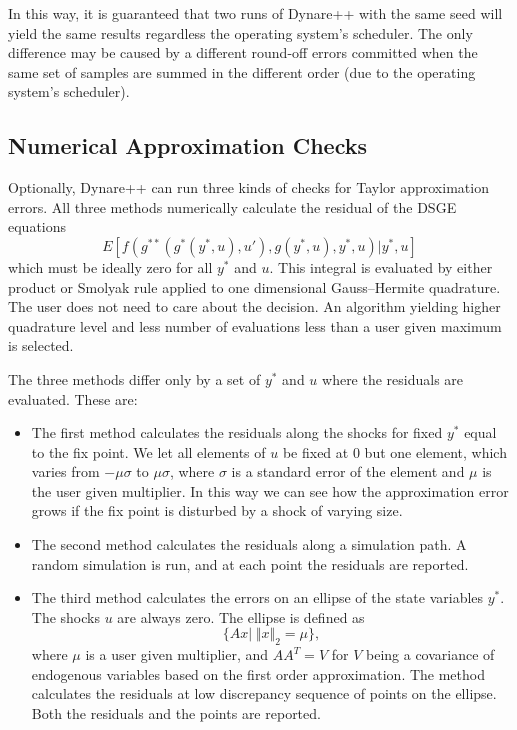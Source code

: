 \documentclass[10pt]{article}
\begin{document}
In this way, it is guaranteed that two runs of Dynare++
with the same seed will yield the same results regardless the
operating system's scheduler. The only difference may be caused by a
different round-off errors committed when the same set of samples are
summed in the different order (due to the operating system's scheduler).

\subsection{Numerical Approximation Checks}
\label{checks}

Optionally, Dynare++ can run three kinds of checks for Taylor
approximation errors. All three methods numerically calculate
the residual of the DSGE equations
\[
E[f(g^{**}(g^*(y^*,u),u'),g(y^*,u),y^*,u)|y^*,u]
\]
which must be ideally zero for all $y^*$ and $u$. This integral is
evaluated by either product or Smolyak rule applied to one dimensional
Gauss--Hermite quadrature. The user does not need to care about the
decision. An algorithm yielding higher quadrature level and less
number of evaluations less than a user given maximum is selected.

The three methods differ only by a set of $y^*$ and $u$ where the
residuals are evaluated. These are:
\begin{itemize}
\item The first method calculates the residuals along the shocks for
fixed $y^*$ equal to the fix point. We let all elements of $u$ be
fixed at $0$ but one element, which varies from $-\mu\sigma$ to
$\mu\sigma$, where $\sigma$ is a standard error of the element and
$\mu$ is the user given multiplier. In this way we can see how the
approximation error grows if the fix point is disturbed by a shock of
varying size.
\item The second method calculates the residuals along a simulation
path. A random simulation is run, and at each point the residuals are
reported.
\item The third method calculates the errors on an ellipse of the
state variables $y^*$. The shocks $u$ are always zero. The ellipse is
defined as
\[\{Ax|\; \Vert x\Vert_2=\mu\},\]
where $\mu$ is a user given multiplier, and $AA^T=V$ for $V$ being a
covariance of endogenous variables based on the first order
approximation. The method calculates the residuals at low discrepancy
sequence of points on the ellipse. Both the residuals and the points
are reported.
\end{itemize}
\end{document}
